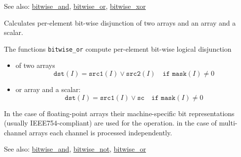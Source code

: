 See also: \hyperref[cppfunc.bitwise.and]{bitwise\_and}, \hyperref[cppfunc.bitwise.or]{bitwise\_or}, \hyperref[cppfunc.bitwise.xor]{bitwise\_xor}


\label{cppfunc.bitwise.or}
Calculates per-element bit-wise disjunction of two arrays and an array and a scalar.

\begin{description}
\end{description}

The functions \texttt{bitwise\_or} compute per-element bit-wise logical disjunction
\begin{itemize}
    \item of two arrays
    \[\texttt{dst}(I) = \texttt{src1}(I) \vee \texttt{src2}(I)\quad\texttt{if mask}(I)\ne0\]
    \item or array and a scalar:
    \[\texttt{dst}(I) = \texttt{src1}(I) \vee \texttt{sc}\quad\texttt{if mask}(I)\ne0\]
\end{itemize}

In the case of floating-point arrays their machine-specific bit representations (usually IEEE754-compliant) are used for the operation. in the case of multi-channel arrays each channel is processed independently.

See also: \hyperref[cppfunc.bitwise.and]{bitwise\_and}, \hyperref[cppfunc.bitwise.not]{bitwise\_not}, \hyperref[cppfunc.bitwise.or]{bitwise\_or}

